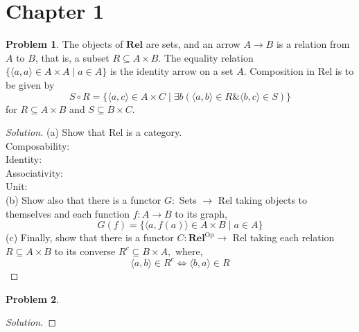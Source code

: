 \documentclass[fontsize=14pt]{scrartcl}
\theoremstyle{definition}
\newtheorem{problem-internal}{Problem}[section]
\newenvironment{problem}{
\medskip
\begin{problem-internal}
}{
\end{problem-internal}
}
\newenvironment{solution}{
\begin{proof}[Solution]
\vspace{-8px}
\setlength{\parskip}{4px}
\setlength{\parindent}{0px}
}{
\end{proof}
}
\begin{document}
\section*{Chapter 1}

\setcounter{section}{9}
\setcounter{problem-internal}{0}
\begin{problem}
    The objects of $\mathbf{R e l}$ are sets, and an arrow $A \rightarrow B$ is a relation from $A$ to $B$, that is, a subset $R \subseteq A \times B .$ The equality relation $\{\langle a, a\rangle \in A \times A \mid a \in A\}$ is the identity arrow on a set $A .$ Composition in Rel is to be given by
    $$
    S \circ R=\{\langle a, c\rangle \in A \times C \mid \exists b(\langle a, b\rangle \in R \&\langle b, c\rangle \in S)\}
    $$
    for $R \subseteq A \times B$ and $S \subseteq B \times C$.
\end{problem}
\begin{solution}
(a) Show that Rel is a category.\\
Composability:\\
Identity:\\
Associativity:\\
Unit:\\

(b) Show also that there is a functor $G:$ Sets $\rightarrow$ Rel taking objects to themselves and each function $f: A \rightarrow B$ to its graph,
$$
G(f)=\{\langle a, f(a)\rangle \in A \times B \mid a \in A\}
$$
(c) Finally, show that there is a functor $C: \mathbf{R e l}^{\mathrm{Op}} \rightarrow$ Rel taking each relation $R \subseteq A \times B$ to its converse $R^{c} \subseteq B \times A,$ where,
$$
\langle a, b\rangle \in R^{c} \Leftrightarrow\langle b, a\rangle \in R
$$

\end{solution}

\setcounter{section}{9}
\setcounter{problem-internal}{1}
\begin{problem}

\end{problem}
\begin{solution}

\end{solution}
\end{document}
